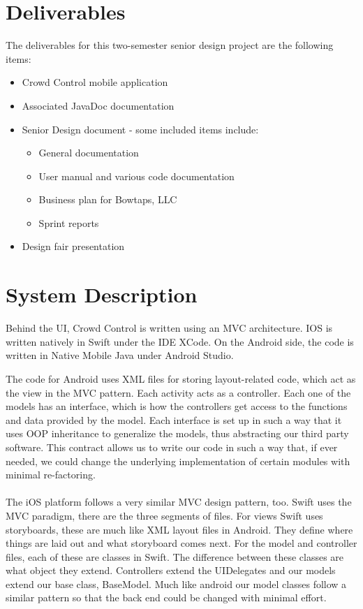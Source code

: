 \section{Deliverables}

The deliverables for this two-semester senior design project are the following items:
	\begin{itemize}
	  \item Crowd Control mobile application
	  \item Associated JavaDoc documentation
	  \item Senior Design document - some included items include:
	  	\begin{itemize}
		  \item General documentation
		  \item User manual and various code documentation
		  \item Business plan for Bowtaps, LLC
		  \item Sprint reports
		\end{itemize}
	  \item Design fair presentation
	\end{itemize}


\section{System Description}
Behind the UI, Crowd Control is written using an MVC architecture. IOS is written natively in Swift under the IDE XCode. On the Android side, the code is written in Native Mobile Java under Android Studio.

The code for Android uses XML files for storing layout-related code, which act as the view in the MVC pattern. Each activity acts as a controller. Each one of the models has an interface, which is how the controllers get access to the functions and data provided by the model. Each interface is set up in such a way that it uses OOP inheritance to generalize the models, thus abstracting our third party software. This contract allows us to write our code in such a way that, if ever needed, we could change the underlying implementation of certain modules with minimal re-factoring.\\\\
The iOS platform follows a very similar MVC design pattern, too. Swift uses the MVC paradigm, there are the three segments of files.  For views Swift uses storyboards, these are much like XML layout files in Android.  They define where things are laid out and what storyboard comes next.  For the model and controller files, each of these are classes in Swift.  The difference between these classes are what object they extend.  Controllers extend the UIDelegates and our models extend our base class, BaseModel.  Much like android our model classes follow a similar pattern so that the back end could be changed with minimal effort. \\


